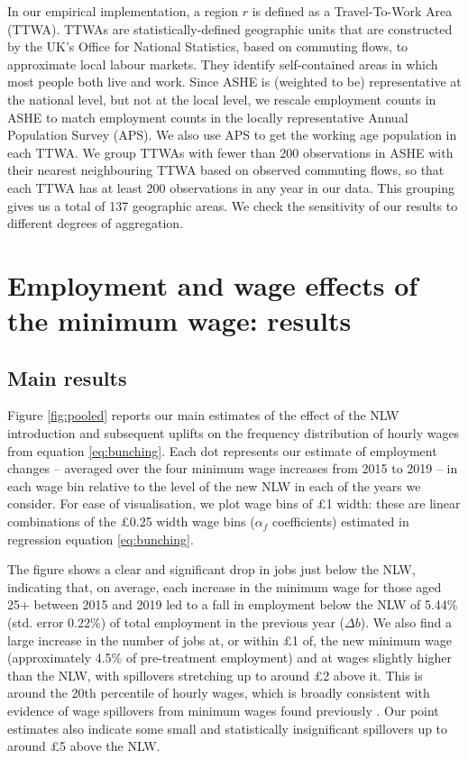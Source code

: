 In our empirical implementation, a region $r$ is defined as a Travel-To-Work Area (TTWA). TTWAs are statistically-defined geographic units that are constructed by the UK's Office for National Statistics, based on commuting flows, to approximate local labour markets. They identify self-contained areas in which most people both live and work. Since ASHE is (weighted to be) representative at the national level, but not at the local level, we rescale employment counts in ASHE to match employment counts in the locally representative Annual Population Survey (APS). We also use APS to get the working age population in each TTWA. We group TTWAs with fewer than 200 observations in ASHE with their nearest neighbouring TTWA based on observed commuting flows, so that each TTWA has at least 200 observations in any year in our data. This grouping gives us a total of 137 geographic areas. We check the sensitivity of our results to different degrees of aggregation.



\section{Employment and wage effects of the minimum wage: results} \label{sec:lm_empirics}

\subsection{Main results} \label{sec:lm_results}

Figure \ref{fig:pooled} reports our main estimates of the effect of the NLW introduction and subsequent uplifts on the frequency distribution of hourly wages from equation \ref{eq:bunching}. Each dot represents our estimate of employment changes -- averaged over the four minimum wage increases from 2015 to 2019 -- in each wage bin relative to the level of the new NLW in each of the years we consider. For ease of visualisation, we plot wage bins of \pounds 1 width: these are linear combinations of the \pounds 0.25 width wage bins ($\alpha_f$ coefficients) estimated in regression equation \ref{eq:bunching}. 

The figure shows a clear and significant drop in jobs just below the NLW, indicating that, on average, each increase in the minimum wage for those aged 25+ between 2015 and 2019 led to a fall in employment below the NLW of 5.44\% (std. error 0.22\%) of total employment in the previous year ($\Delta b$). We also find a large increase in the number of jobs at, or within \pounds 1 of, the new minimum wage (approximately 4.5\% of pre-treatment employment) and at wages slightly higher than the NLW, with spillovers stretching up to around \pounds 2 above it. This is around the 20th percentile of hourly wages, which is broadly consistent with evidence of wage spillovers from minimum wages found previously \citep{Cengiz2019,AvramHarkness2019,AutorManningSmith2016}. Our point estimates also indicate some small and statistically insignificant spillovers up to around \pounds 5 above the NLW.

